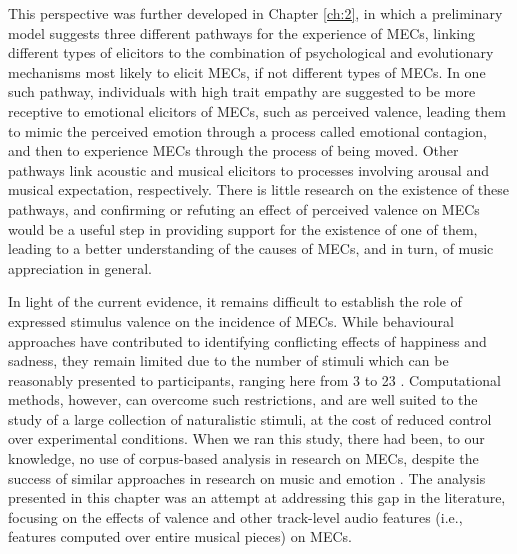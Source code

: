 This perspective was further developed in Chapter \ref{ch:2}, in which a preliminary model suggests three different pathways for the experience of MECs, linking different types of elicitors to the combination of psychological and evolutionary mechanisms most likely to elicit MECs, if not different types of MECs. In one such pathway, individuals with high trait empathy are suggested to be more receptive to emotional elicitors of MECs, such as perceived valence, leading them to mimic the perceived emotion through a process called emotional contagion, and then to experience MECs through the process of being moved. Other pathways link acoustic and musical elicitors to processes involving arousal and musical expectation, respectively. There is little research on the existence of these pathways, and confirming or refuting an effect of perceived valence on MECs would be a useful step in providing support for the existence of one of them, leading to a better understanding of the causes of MECs, and in turn, of music appreciation in general.

In light of the current evidence, it remains difficult to establish the role of expressed stimulus valence on the incidence of MECs. While behavioural approaches have contributed to identifying conflicting effects of happiness and sadness, they remain limited due to the number of stimuli which can be reasonably presented to participants, ranging here from 3 \parencite{bannister2018} to 23 \parencite{grewe2011}. Computational methods, however, can overcome such restrictions, and are well suited to the study of a large collection of naturalistic stimuli, at the cost of reduced control over experimental conditions. When we ran this study, there had been, to our knowledge, no use of corpus-based analysis in research on MECs, despite the success of similar approaches in research on music and emotion \parencite[e.g.,][]{eerola2011}. The analysis presented in this chapter was an attempt at addressing this gap in the literature, focusing on the effects of valence and other track-level audio features (i.e., features computed over entire musical pieces) on MECs.

